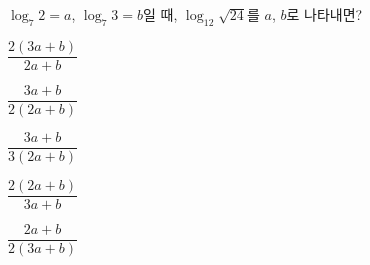 $\log_7 2=a$, $\log_7 3=b$일 때, $\log_{12}\sqrt{24}$를 $a$, $b$로 나타내면?
\begin{choices32}{\rule[-3ex]{0pt}{8ex}$\dfrac{2(3a+b)}{2a+b}$}{\rule[-3ex]{0pt}{8ex}$\dfrac{3a+b}{2(2a+b)}$}{\rule[-3ex]{0pt}{8ex}$\dfrac{3a+b}{3(2a+b)}$}{\rule[-3ex]{0pt}{8ex}$\dfrac{2(2a+b)}{3a+b}$}{\rule[-3ex]{0pt}{8ex}$\dfrac{2a+b}{2(3a+b)}$}\end{choices32}
